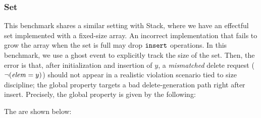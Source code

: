 \subsubsection*{Set} This benchmark shares a similar setting with \textsf{Stack}, where we have an effectful set implemented with a fixed-size array. An incorrect implementation that fails to grow the array when the set is full may drop $\boldsymbol{{\tt insert}}$ operations. In this benchmark, we use a ghost event to explicitly track the size of the set. 
Then, the error is that, after initialization and insertion of \(y\), a \emph{mismatched} delete request (\(\neg(\mathit{elem}=y)\)) should not appear in a realistic violation scenario tied to size discipline; the global property targets a bad delete-generation path right after insert. Precisely, the global property is given by the following:
\vspace{-.35cm}\par{}
\vspace{-.4cm}\par\nobreak\noindent
The \tyName{} are shown below:
\vspace{-.35cm}\par{}
